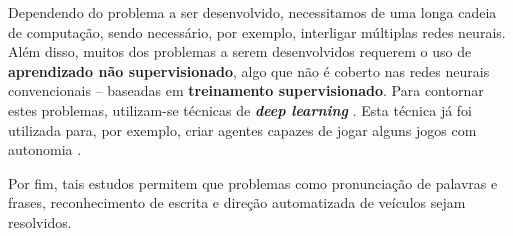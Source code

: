 Dependendo do problema a ser desenvolvido, necessitamos de uma longa cadeia de
computação, sendo necessário, por exemplo, interligar múltiplas redes neurais.
Além disso, muitos dos problemas a serem desenvolvidos requerem o uso de
\textbf{ aprendizado não supervisionado}, algo que não é coberto nas redes
neurais convencionais -- baseadas em \textbf{treinamento supervisionado}. Para
contornar estes problemas, utilizam-se técnicas de \textbf{\textit{deep
learning}} \cite{DBLP:journals/corr/Schmidhuber14}. Esta técnica já foi
utilizada para, por exemplo, criar agentes capazes de jogar alguns jogos com
autonomia \cite{mnih-atari-2013}.

Por fim, tais estudos permitem que problemas como pronunciação de palavras e
frases, reconhecimento de escrita e direção automatizada de veículos
\cite{Russell:1995:AIM:193191} sejam resolvidos.
